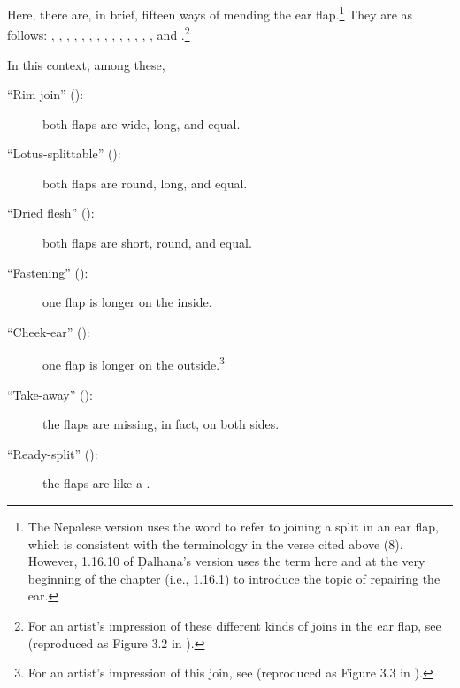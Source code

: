 \begin{translation}
Here, there are, in brief, fifteen ways of mending the ear flap.\footnote{The Nepalese version 
uses the word  to refer to joining a split in an ear flap, which is consistent 
with the terminology in the verse cited above (8). However, 1.16.10 of Ḍalhaṇa's version 
\citep[77]{vulgate} uses the term  here and at the very beginning of the 
chapter (i.e., 1.16.1) to introduce the topic of repairing the ear.}  They are as follows:
    , , , , , , , , , , 
    , ,
    , , and .\footnote{For an artist's impression of these different kinds of joins in the ear flap, see \cite[290]{majn-1975} (reproduced as Figure 3.2 in \cite[154]{wuja-2003}).}
    
    In this context, among these, 

    \begin{description}
        
\item[\mdseries``Rim-join'' ():]
        both flaps are wide, long, and equal.
        
\item[\mdseries``Lotus-splittable'' ():]
        both flaps are round, long, and equal.
        
\item[\mdseries``Dried flesh'' ():]
        both flaps are short, round, and equal.
        
\item[\mdseries``Fastening'' ():]
        one flap is longer on the inside.
        
\item[\mdseries``Cheek-ear'' ():]
        one flap is longer on the outside.\footnote{For an artist's impression of this join, see \cite[291]{majn-1975} (reproduced as Figure 3.3 in \cites[155]{wuja-2003}).}
        
\item[\mdseries``Take-away'' ():]
        the flaps are missing, in fact, on both sides.
        
\item[\mdseries``Ready-split'' ():]
        the flaps are like a .
        

\end{description}
\end{translation}
